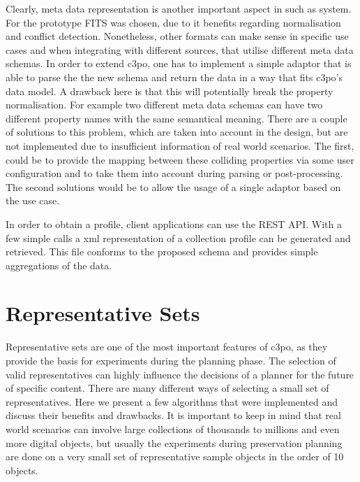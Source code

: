 Clearly, meta data representation is another important aspect in such as system. For the prototype FITS was chosen, due to it benefits regarding normalisation and conflict detection. Nonetheless, other formats can make sense in specific use cases and when integrating with different sources, that utilise different meta data schemas. In order to extend c3po, one has to implement a simple adaptor that is able to parse the the new schema and return the data in a way that fits c3po's data model. A drawback here is that this will potentially break the property normalisation. For example two different meta data schemas can have two different property names with the same semantical meaning. There are a couple of solutions to this problem, which are taken into account in the design, but are not implemented due to insufficient information of real world scenarios. The first, could be to provide the mapping between these colliding properties via some user configuration and to take them into account during parsing or post-processing. The second solutions would be to allow the usage of a single adaptor based on the use case.

In order to obtain a profile, client applications can use the REST API. With a few simple calls a xml representation of a collection profile can be generated and retrieved. This file conforms to the proposed schema and provides simple aggregations of the data.
 
\section{Representative Sets}
Representative sets are one of the most important features of c3po, as they provide the basis for experiments during the planning phase. The selection of valid representatives can highly influence the decisions of a planner for the future of specific content. There are many different ways of selecting a small set of representatives.
Here we present a few algorithms that were implemented and discuss their benefits and drawbacks. It is important to keep in mind that real world scenarios can involve large collections of thousands to millions and even more digital objects, but usually the experiments during preservation planning are done on a very small set of representative sample objects in the order of 10 objects. 

